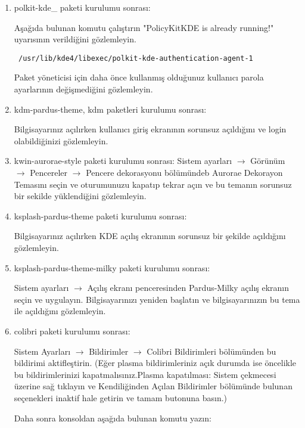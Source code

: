 \documentclass[a4paper,10pt]{article}
\begin{document}
\begin{enumerate}

\item polkit-kde\_ paketi kurulumu sonrası:

Aşağıda bulunan komutu çalıştırın "PolicyKitKDE is already running!" uyarısının verildiğini gözlemleyin.
\begin{verbatim}
 /usr/lib/kde4/libexec/polkit-kde-authentication-agent-1
\end{verbatim}

Paket yöneticisi için daha önce kullanmış olduğunuz kullanıcı parola ayarlarının değişmediğini gözlemleyin.

\item  kdm-pardus-theme, kdm paketleri kurulumu sonrası:

Bilgisayarınız açılırken kullanıcı giriş ekranının sorunsuz açıldığını ve login olabildiğinizi gözlemleyin.

\item kwin-aurorae-style paketi kurulumu sonrası:
Sistem ayarları $\rightarrow$ Görünüm $\rightarrow$ Pencereler $\rightarrow$ Pencere dekorasyonu bölümündeb Aurorae Dekorayon Temasını seçin ve oturumunuzu kapatıp tekrar açın ve bu temanın sorunsuz bir sekilde yüklendiğini gözlemleyin.

\item  ksplash-pardus-theme paketi kurulumu sonrası:

Bilgisayarınız açılırken KDE açılış ekranının sorunsuz bir şekilde açıldığını gözlemleyin.

\item  ksplash-pardus-theme-milky paketi kurulumu sonrası:

Sistem ayarları $\rightarrow$ Açılış ekranı penceresinden Pardus-Milky açılış ekranın seçin ve uygulayın. Bilgisayarınızı yeniden başlatın ve bilgisayarınızın bu tema ile açıldığını gözlemleyin.

\item colibri paketi kurulumu sonrası:

Sistem Ayarları $\rightarrow$ Bildirimler $\rightarrow$ Colibri Bildirimleri bölümünden bu bildirimi aktifleştirin. (Eğer plasma bildirimleriniz açık durumda ise öncelikle bu bildirimlerinizi kapatmalısınız.Plasma kapatılması: Sistem çekmecesi üzerine sağ tıklayın ve Kendiliğinden Açılan Bildirimler bölümünde bulunan seçenekleri inaktif hale getirin ve tamam butonuna basın.)

Daha sonra konsoldan aşağıda bulunan komutu yazın:


\end{enumerate}
\end{document}
